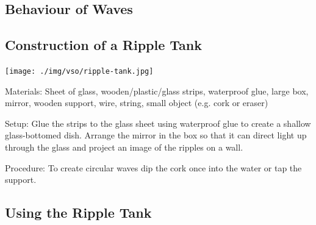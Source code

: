 \begin{multicols}{2}

\section*{Behaviour of Waves}


\subsection{Construction of a Ripple Tank}

\begin{center}
\texttt{[image: ./img/vso/ripple-tank.jpg]}
\end{center}

\begin{description*}
\item[Materials:]{Sheet of glass, wooden/plastic/glass strips, waterproof glue, large box, mirror, wooden support, wire, string, small object (e.g. cork or eraser)}
\item[Setup:]{Glue the strips to the glass sheet using waterproof glue to create a shallow glass-bottomed dish. Arrange the mirror in the box so that it can direct light up through the glass and project an image of the ripples on a wall.}
\item[Procedure:]{To create circular waves dip the cork once into the water or tap the support.}
\end{description*}

\columnbreak

\subsection{Using the Ripple Tank}
\label{sub:rippletank}



\end{multicols}
